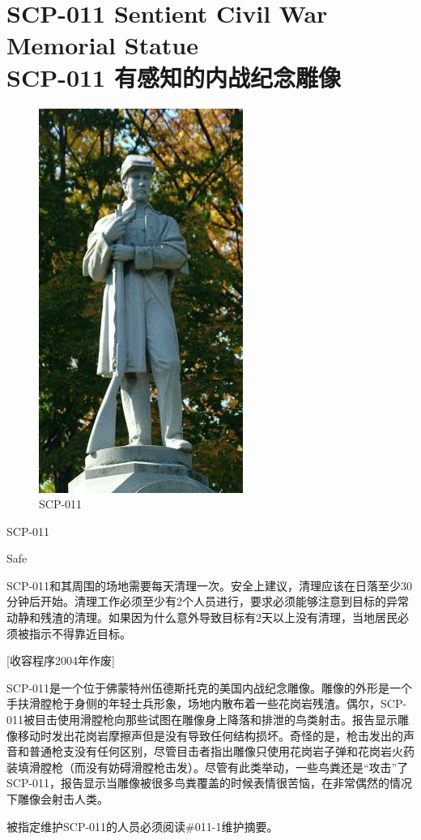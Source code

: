 \chapter[SCP-011 有感知的内战纪念雕像]{
    SCP-011 Sentient Civil War Memorial Statue\\
    SCP-011 有感知的内战纪念雕像
}

\label{chap:SCP-011}

\begin{figure}[H]
    \centering
    \includegraphics[width=0.3\linewidth]{images/SCP-011.jpg}
    \caption*{SCP-011}
\end{figure}

SCP-011

Safe

SCP-011和其周围的场地需要每天清理一次。安全上建议，清理应该在日落至少30分钟后开始。清理工作必须至少有2个人员进行，要求必须能够注意到目标的异常动静和残渣的清理。如果因为什么意外导致目标有2天以上没有清理，当地居民必须被指示不得靠近目标。

[收容程序2004年作废]

SCP-011是一个位于佛蒙特州伍德斯托克的美国内战纪念雕像。雕像的外形是一个手扶滑膛枪于身侧的年轻士兵形象，场地内散布着一些花岗岩残渣。偶尔，SCP-011被目击使用滑膛枪向那些试图在雕像身上降落和排泄的鸟类射击。报告显示雕像移动时发出花岗岩摩擦声但是没有导致任何结构损坏。奇怪的是，枪击发出的声音和普通枪支没有任何区别，尽管目击者指出雕像只使用花岗岩子弹和花岗岩火药装填滑膛枪（而没有妨碍滑膛枪击发）。尽管有此类举动，一些鸟粪还是“攻击”了SCP-011，报告显示当雕像被很多鸟粪覆盖的时候表情很苦恼，在非常偶然的情况下雕像会射击人类。

被指定维护SCP-011的人员必须阅读\#011-1维护摘要。


